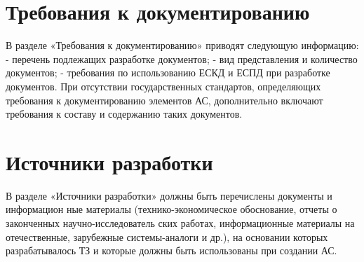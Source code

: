 {\section{Требования к документированию}
В разделе «Требования к документированию» приводят следующую информацию:
- перечень подлежащих разработке документов;
- вид представления и количество документов;
- требования по использованию ЕСКД и ЕСПД при разработке документов.
При отсутствии государственных стандартов, определяющих требования к документированию
элементов АС, дополнительно включают требования к составу и содержанию таких документов.

\section{Источники разработки}
В разделе «Источники разработки» должны быть перечислены документы и информацион
ные материалы (технико-экономическое обоснование, отчеты о законченных научно-исследователь
ских работах, информационные материалы на отечественные, зарубежные системы-аналоги и др.), на
основании которых разрабатывалось ТЗ и которые должны быть использованы при создании АС.
}
